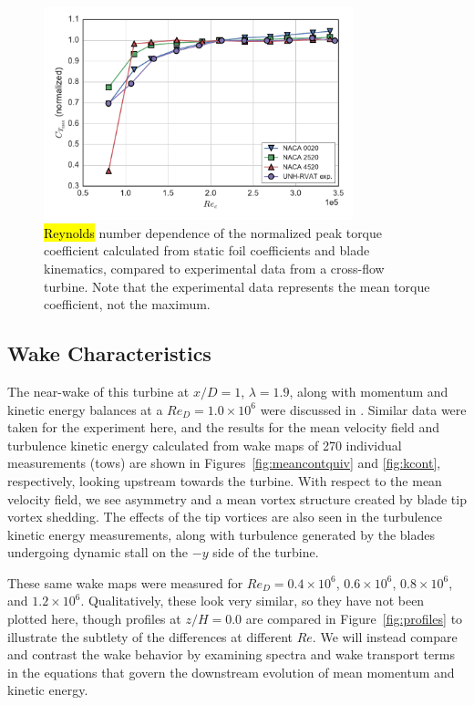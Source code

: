\documentclass[energies,article,accept,moreauthors,pdftex,10pt,a4paper]{mdpi}
\theoremstyle{mdpi}
\newcounter{ex}
\newcounter{re}
\begin{document}
\begin{figure}[H]
    \centering

    \includegraphics[width=0.8\textwidth]{figures/cft_re_dep_foils}
    \caption{\hl {Reynolds} number dependence of the normalized peak torque
        coefficient calculated from static foil coefficients and blade kinematics,
        compared to experimental data from a cross-flow turbine. Note that the
        experimental data represents the mean torque coefficient, not the maximum.}

    \label{fig:foils-C_T-Re-dep}
\end{figure}


\subsection{Wake Characteristics}

The near-wake of this turbine at $x/D=1$, $\lambda=1.9$, along with momentum and
kinetic energy balances at a $Re_D = 1.0 \times 10^6$ were discussed in
\cite{Bachant2015-JoT}. Similar data were taken for the experiment here, and the
results for the mean velocity field and turbulence kinetic energy calculated
from wake maps of 270 individual measurements (tows) are shown in
Figures~\ref{fig:meancontquiv} and \ref{fig:kcont}, respectively, looking
upstream towards the turbine. With respect to the mean velocity field, we see
asymmetry and a mean vortex structure created by blade tip vortex shedding. The
effects of the tip vortices are also seen in the turbulence kinetic energy
measurements, along with turbulence generated by the blades undergoing dynamic
stall on the $-y$ side of the turbine.

These same wake maps were measured for $Re_D = 0.4 \times 10^6$, $0.6 \times
10^6$, $0.8 \times 10^6$, and $1.2 \times 10^6$. Qualitatively, these look very
similar, so they have not been plotted here, though profiles at $z/H=0.0$ are
compared in Figure~\ref{fig:profiles} to illustrate the subtlety of the
differences at different $Re$. We will instead compare and contrast the wake
behavior by examining spectra and wake transport terms in the equations that
govern the downstream evolution of mean momentum and kinetic energy.
\end{document}

